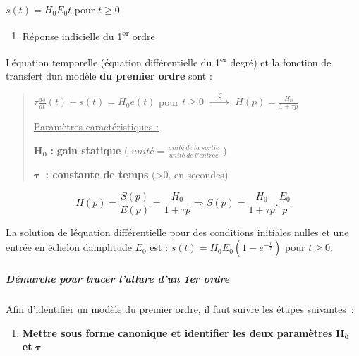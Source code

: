 \(s(t) = H_{0}E_{0}t\) pour \(t \geq 0\)

\begin{enumerate}
\def\labelenumi{\arabic{enumi}.}
\setcounter{enumi}{2}
\item
  \protect\hypertarget{mod-_Toc379198200}{}{}Réponse indicielle du 1\textsuperscript{er} ordre
\end{enumerate}

L\textquotesingle équation temporelle (équation différentielle du 1\textsuperscript{er} degré) et la fonction de transfert d\textquotesingle un modèle \textbf{du premier ordre} sont :

\begin{quote}
\(\tau\frac{ds}{dt}(t) + s(t) = H_{0}e(t)\) pour \(t \geq 0\) \(\overset{\quad\mathcal{L}\quad}{\rightarrow}\) \(H(p) = \frac{H_{0}}{1 + \tau p}\)

\ul{Paramètres caractéristiques :}

\(\mathbf{H}_{\mathbf{0}}\) \textbf{:} \textbf{gain statique} ( \(unité = \frac{unité\ de\ la\ sortie}{unité\ de\ l'entrée}\) )

\(\mathbf{\tau}\)\textbf{~: constante de temps} (\textgreater0, en secondes)
\end{quote}

\[H(p) = \frac{S(p)}{E(p)} = \frac{H_{0}}{1 + \tau p} \Rightarrow S(p) = \frac{H_{0}}{1 + \tau p}.\frac{E_{0}}{p}\]

La solution de l\textquotesingle équation différentielle pour des conditions initiales nulles et une entrée en échelon d\textquotesingle amplitude \(E_{0}\) est : \(s(t) = H_{0}E_{0}\left( 1 - e^{- \frac{t}{\tau}} \right)\) pour \(t \geq 0\).

\hypertarget{mod-duxe9marche-pour-tracer-lallure-dun-1er-ordre}{%
\subparagraph*{\texorpdfstring{Démarche pour tracer l'allure d'un 1er ordre }{Démarche pour tracer l'allure d'un 1er ordre }}\label{mod-duxe9marche-pour-tracer-lallure-dun-1er-ordre}}

Afin d'identifier un modèle du premier ordre, il faut suivre les étapes suivantes~:

\begin{enumerate}
\def\labelenumi{\arabic{enumi}.}
\item
  \textbf{Mettre sous forme canonique et identifier les deux paramètres} \(\mathbf{H}_{\mathbf{0}}\) \textbf{et} \(\mathbf{\tau}\)
\end{enumerate}

